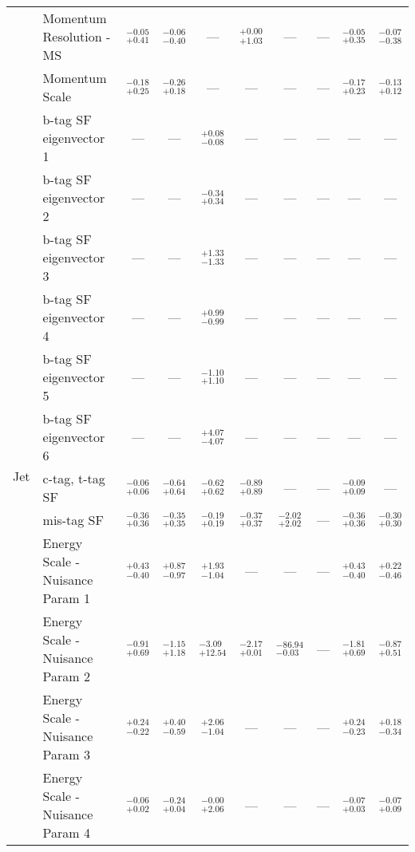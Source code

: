\begin{tabular}{|cl||cccccc|c||c|}
\cline{2-10}
&Momentum Resolution - MS &  $^{-0.05}_{+0.41}$  &  $^{-0.06}_{-0.40}$  & --- &  $^{+0.00}_{+1.03}$  & --- & --- &  $^{-0.05}_{+0.35}$  &  $^{-0.07}_{-0.38}$ \\ 
\cline{2-10}
&Momentum Scale &  $^{-0.18}_{+0.25}$  &  $^{-0.26}_{+0.18}$  & --- & --- & --- & --- &  $^{-0.17}_{+0.23}$  &  $^{-0.13}_{+0.12}$ \\ 
\hline
\multirow{27}{*}{Jet}
&b-tag SF eigenvector 1 & --- & --- &  $^{+0.08}_{-0.08}$  & --- & --- & --- & --- & ---\\ 
\cline{2-10}
&b-tag SF eigenvector 2 & --- & --- &  $^{-0.34}_{+0.34}$  & --- & --- & --- & --- & ---\\ 
\cline{2-10}
&b-tag SF eigenvector 3 & --- & --- &  $^{+1.33}_{-1.33}$  & --- & --- & --- & --- & ---\\ 
\cline{2-10}
&b-tag SF eigenvector 4 & --- & --- &  $^{+0.99}_{-0.99}$  & --- & --- & --- & --- & ---\\ 
\cline{2-10}
&b-tag SF eigenvector 5 & --- & --- &  $^{-1.10}_{+1.10}$  & --- & --- & --- & --- & ---\\ 
\cline{2-10}
&b-tag SF eigenvector 6 & --- & --- &  $^{+4.07}_{-4.07}$  & --- & --- & --- & --- & ---\\ 
\cline{2-10}
&c-tag, t-tag SF &  $^{-0.06}_{+0.06}$  &  $^{-0.64}_{+0.64}$  &  $^{-0.62}_{+0.62}$  &  $^{-0.89}_{+0.89}$  & --- & --- &  $^{-0.09}_{+0.09}$  & ---\\ 
\cline{2-10}
&mis-tag SF &  $^{-0.36}_{+0.36}$  &  $^{-0.35}_{+0.35}$  &  $^{-0.19}_{+0.19}$  &  $^{-0.37}_{+0.37}$  &  $^{-2.02}_{+2.02}$  & --- &  $^{-0.36}_{+0.36}$  &  $^{-0.30}_{+0.30}$ \\ 
\cline{2-10}
&Energy Scale - Nuisance Param 1 &  $^{+0.43}_{-0.40}$  &  $^{+0.87}_{-0.97}$  &  $^{+1.93}_{-1.04}$  & --- & --- & --- &  $^{+0.43}_{-0.40}$  &  $^{+0.22}_{-0.46}$ \\ 
\cline{2-10}
&Energy Scale - Nuisance Param 2 &  $^{-0.91}_{+0.69}$  &  $^{-1.15}_{+1.18}$  &  $^{-3.09}_{+12.54}$  &  $^{-2.17}_{+0.01}$  &  $^{-86.94}_{-0.03}$  & --- &  $^{-1.81}_{+0.69}$  &  $^{-0.87}_{+0.51}$ \\ 
\cline{2-10}
&Energy Scale - Nuisance Param 3 &  $^{+0.24}_{-0.22}$  &  $^{+0.40}_{-0.59}$  &  $^{+2.06}_{-1.04}$  & --- & --- & --- &  $^{+0.24}_{-0.23}$  &  $^{+0.18}_{-0.34}$ \\ 
\cline{2-10}
&Energy Scale - Nuisance Param 4 &  $^{-0.06}_{+0.02}$  &  $^{-0.24}_{+0.04}$  &  $^{-0.00}_{+2.06}$  & --- & --- & --- &  $^{-0.07}_{+0.03}$  &  $^{-0.07}_{+0.09}$ \\ 

\end{tabular}
